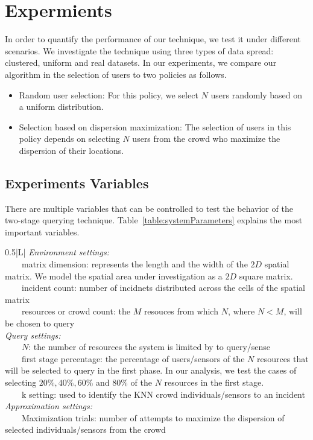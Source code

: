 \documentclass{acm_proc_article-sp}
\newcommand{\tabitem}{~~\llap{\textbullet}~~}
\begin{document}
\section{Expermients}
In order to quantify the performance of our technique, we test it under different scenarios. We investigate the technique using three types of data spread: clustered, uniform and real datasets. In our experiments, we compare our algorithm in the selection of users to two policies as follows.
\begin{itemize}
\item Random user selection: For this policy, we select $N$ users randomly based on a uniform distribution.
\item Selection based on dispersion maximization: The selection of users in this policy depends on selecting $N$ users from the crowd who maximize the dispersion of their locations.
\end{itemize}
\subsection{Experiments Variables}
There are multiple variables that can be controlled to test the behavior of the two-stage querying technique. Table~\ref{table:systemParameters} explains the most important variables.


\begin{table}{}
\centering
\begin{tabulary}{0.5\textwidth}{|L|}
\hline
\textit{Environment settings: }\\
\tabitem matrix dimension: represents the length and 
the width of the $2D$ spatial matrix. We model the spatial area under investigation as a $2D$ square matrix.\\
\tabitem incident count: number of incidnets distributed across the cells of the spatial matrix\\
\tabitem resources or crowd count: the $M$ resouces from which $N$, where $N < M$, will be chosen to query\\
\hline
\textit{Query settings:}\\
\tabitem $N$: the number of resources the system is limited by to query/sense \\
\tabitem first stage percentage: the percentage of users/sensors of the $N$ resources that will be selected to query in the first phase. In our analysis, we test the cases of selecting $20\%, 40\%, 60\%$ and $80\%$ of the $N$ resources in the first stage.\\
\tabitem k setting: used to identify the KNN crowd individuals/sensors to an incident\\
\hline
\textit{Approximation settings: }\\
\tabitem Maximization trials: number of attempts to maximize the dispersion of selected individuals/sensors from the crowd\\
\hline
\end{tabulary}  
\caption{Different parameters of the two-stage querying technique.}
\label{table:systemParameters}
\end{table}
\end{document}
